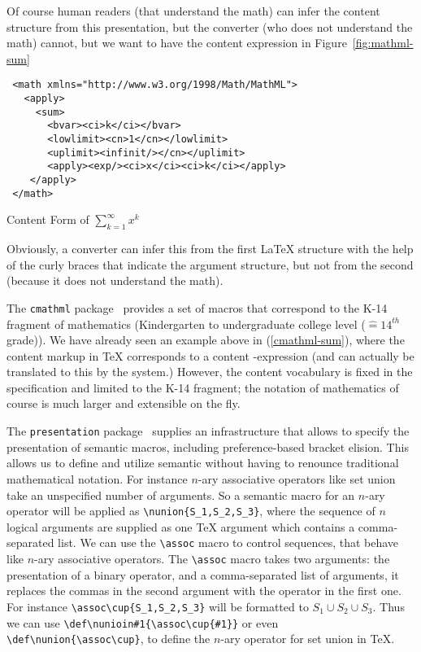 Of course human readers (that understand the math) can infer the content structure from
this presentation, but the {\latexml} converter (who does not understand the math) cannot,
but we want to have the content {\mathml} expression in Figure~\ref{fig:mathml-sum}
\begin{exfig}\scriptsize
\begin{verbatim}
 <math xmlns="http://www.w3.org/1998/Math/MathML">
   <apply> 
     <sum>
       <bvar><ci>k</ci></bvar>
       <lowlimit><cn>1</cn></lowlimit>
       <uplimit><infinit/></cn></uplimit>
       <apply><exp/><ci>x</ci><ci>k</ci></apply>
    </apply>
 </math>
\end{verbatim}\vspace*{-.6cm}
  \caption{Content {\mathml} Form of $\sum_{k=1}^\infty x^k$}\label{fig:mathml-sum}
\end{exfig}
 
Obviously, a converter can infer this from the first {\LaTeX} structure with the help of
the curly braces that indicate the argument structure, but not from the second (because it
does not understand the math).

The \verb|cmathml| package~\cite{Kohlhase:tbscml06} provides a set of macros that
correspond to the K-14 fragment of mathematics (Kindergarten to undergraduate college
level ($\hat=14^{th}$ grade)). We have already seen an example above in
(\ref{cmathml-sum}), where the content markup in {\TeX} corresponds to a content
{\mathml}-expression (and can actually be translated to this by the {\latexml} system.)
However, the content {\mathml} vocabulary is fixed in the {\mathml} specification and
limited to the K-14 fragment; the notation of mathematics of course is much larger and
extensible on the fly.

The \verb|presentation| package~\cite{Kohlhase:ipsmsl06} supplies an infrastructure that
allows to specify the presentation of semantic macros, including preference-based bracket
elision. This allows us to define and utilize semantic without having to
renounce traditional mathematical notation. For instance $n$-ary
associative operators like set union take an unspecified number of arguments.  So a
semantic macro for an $n$-ary operator will be applied as \verb|\nunion{S_1,S_2,S_3}|, where
the sequence of $n$ logical arguments are supplied as one {\TeX} argument which contains a
comma-separated list. We can use the \verb|\assoc| macro to control sequences, that behave like
$n$-ary associative operators. The \verb|\assoc| macro takes two arguments: the presentation of
a binary operator, and a comma-separated list of arguments, it replaces the commas in the
second argument with the operator in the first one. For instance \verb|\assoc\cup{S_1,S_2,S_3}|
will be formatted to $S_1\cup S_2\cup S_3$. Thus we can use
\verb|\def\nunioin#1{\assoc\cup{#1}}| or even \verb|\def\nunion{\assoc\cup}|, to define the $n$-ary
operator for set union in {\TeX}. 

